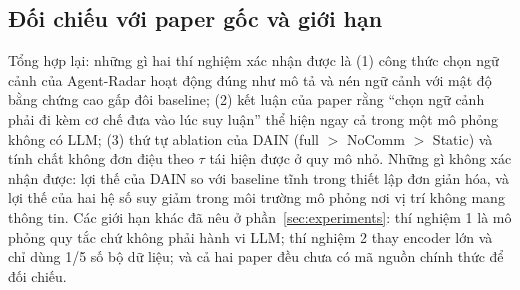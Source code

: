 \subsection{Đối chiếu với paper gốc và giới hạn}
Tổng hợp lại: những gì hai thí nghiệm xác nhận được là (1) công thức chọn ngữ cảnh của Agent-Radar hoạt động đúng như mô tả và nén ngữ cảnh với mật độ bằng chứng cao gấp đôi baseline; (2) kết luận của paper rằng ``chọn ngữ cảnh phải đi kèm cơ chế đưa vào lúc suy luận'' thể hiện ngay cả trong một mô phỏng không có LLM; (3) thứ tự ablation của DAIN (full $>$ NoComm $>$ Static) và tính chất không đơn điệu theo $\tau$ tái hiện được ở quy mô nhỏ. Những gì không xác nhận được: lợi thế của DAIN so với baseline tĩnh trong thiết lập đơn giản hóa, và lợi thế của hai hệ số suy giảm trong môi trường mô phỏng nơi vị trí không mang thông tin. Các giới hạn khác đã nêu ở phần~\ref{sec:experiments}: thí nghiệm 1 là mô phỏng quy tắc chứ không phải hành vi LLM; thí nghiệm 2 thay encoder lớn và chỉ dùng 1/5 số bộ dữ liệu; và cả hai paper đều chưa có mã nguồn chính thức để đối chiếu.
